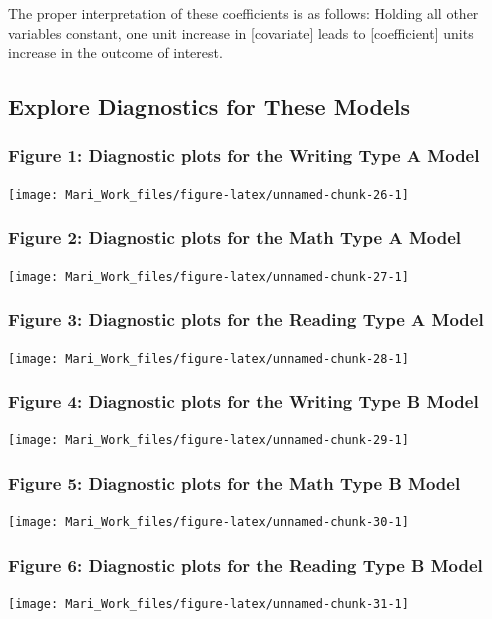 \documentclass[
]{article}
\begin{document}
The proper interpretation of these coefficients is as follows: Holding
all other variables constant, one unit increase in {[}covariate{]} leads
to {[}coefficient{]} units increase in the outcome of interest.

\subsection{Explore Diagnostics for These
Models}\label{explore-diagnostics-for-these-models}

\subsubsection{Figure 1: Diagnostic plots for the Writing Type A
Model}\label{figure-1-diagnostic-plots-for-the-writing-type-a-model}

\texttt{[image: Mari\_Work\_files/figure-latex/unnamed-chunk-26-1]}

\subsubsection{Figure 2: Diagnostic plots for the Math Type A
Model}\label{figure-2-diagnostic-plots-for-the-math-type-a-model}

\texttt{[image: Mari\_Work\_files/figure-latex/unnamed-chunk-27-1]}

\subsubsection{Figure 3: Diagnostic plots for the Reading Type A
Model}\label{figure-3-diagnostic-plots-for-the-reading-type-a-model}

\texttt{[image: Mari\_Work\_files/figure-latex/unnamed-chunk-28-1]}

\subsubsection{Figure 4: Diagnostic plots for the Writing Type B
Model}\label{figure-4-diagnostic-plots-for-the-writing-type-b-model}

\texttt{[image: Mari\_Work\_files/figure-latex/unnamed-chunk-29-1]}

\subsubsection{Figure 5: Diagnostic plots for the Math Type B
Model}\label{figure-5-diagnostic-plots-for-the-math-type-b-model}

\texttt{[image: Mari\_Work\_files/figure-latex/unnamed-chunk-30-1]}

\subsubsection{Figure 6: Diagnostic plots for the Reading Type B
Model}\label{figure-6-diagnostic-plots-for-the-reading-type-b-model}

\texttt{[image: Mari\_Work\_files/figure-latex/unnamed-chunk-31-1]}
\end{document}
